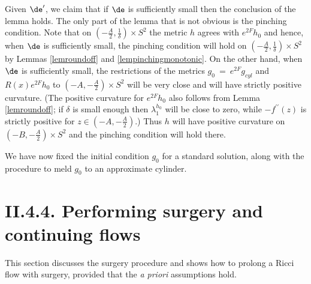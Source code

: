 Given $\de'$, we claim that if $\de$ is sufficiently small then the conclusion of
the lemma holds.
The only part of the lemma that is not obvious is the pinching
condition.  Note that on $\left( -\frac{A}{2}, \frac{1}{\delta} \right) \times S^2$ the metric
$h$ agrees with $e^{2F}h_0$ and hence, when $\de$ is sufficiently
small, the pinching
condition will hold on $\left( -\frac{A}{2}, \frac{1}{\delta} \right) \times S^2$
by Lemmas \ref{lemroundoff} and \ref{lempinchingmonotonic}.
On the other hand, when $\de$ is sufficiently small, the
restrictions of the metrics
$g_{0} \: =\: e^{2F}g_{cyl}$
and $R(x)e^{2F}h_0$ to $(-A,- \frac{A}{2}) \times S^2$
will be very close and will have strictly positive
curvature. (The positive curvature for $e^{2F}h_0$ also follows from Lemma
\ref{lemroundoff}; if $\delta$ is small enough then $\lambda_1^{h_0}$ will be close
to zero, while $- f^{\prime \prime}(z)$ is strictly positive for
$z \in (-A,- \frac{A}{2})$.) Thus $h$ will have positive curvature on $(-B,- \frac{A}{2}) \times S^2$
and the pinching condition will hold there.
\endgroup\par\medskip

We have now fixed the initial condition
$g_{0}$
for a
standard solution, along with the procedure to meld
$g_{0}$
to
an approximate cylinder.

\section{II.4.4. Performing surgery and continuing flows}
\label{II.4.4}
This section discusses the surgery procedure  and shows how to prolong a Ricci
flow with surgery, provided that the {\it a priori} assumptions hold.

